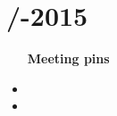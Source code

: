 \section{\logtitle /-2015} %
\attend{\at}{\at}{\at}{\at}


\begin{itemize}
	\item [\textbf{Meeting pins}]
	\item
	\item 
\end{itemize}